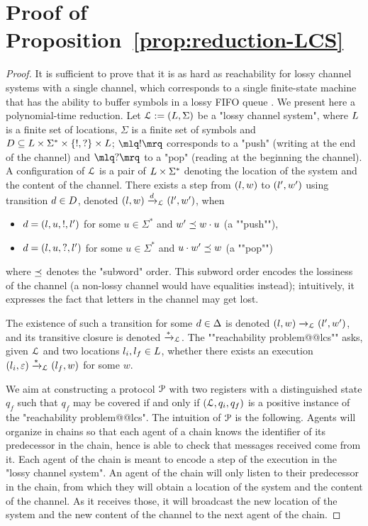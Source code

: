\section{Proof of Proposition~\ref{prop:reduction-LCS}}
\label{app:reduction-lcs}

\propReductionLCS*

\begin{proof}
	It is sufficient to prove that it is as hard as reachability for lossy channel systems with a single channel, which corresponds to a single finite-state machine that has the ability to buffer symbols in a lossy FIFO queue \cite{Schnoebelen2002verifying}. We present here a polynomial-time reduction.
	Let $\mathcal{L} := (L,\Sigma)$ be a "lossy channel system", where $L$ is a finite set of locations, $\Sigma$ is a finite set of symbols and $D \subseteq L \times \Sigma^* \times \{!, ?\} \times L$; $\quotemarks{!}$ corresponds to a "push" (writing at the end of the channel) and $\quotemarks{?}$ to a "pop" (reading at the beginning the channel). A configuration of $\mathcal{L}$ is a pair of $L \times \Sigma^*$ denoting the location of the system and the content of the channel. There exists a step from $(l,w)$ to $(l',w')$ using transition $d \in D$, denoted $(l,w) \xrightarrow{d}_{\mathcal{L}} (l',w')$, when
	\begin{itemize}
		\item $d = (l,u,!,l')$ for some $u \in \Sigma^*$ and $w' \preceq w \cdot u$ (a ""push""),
		\item $d = (l,u,?,l')$ for some $u \in \Sigma^*$ and $u \cdot w' \preceq w$ (a ""pop"")
	\end{itemize}
	where $\preceq$ denotes the "subword" order.
	This subword order encodes the lossiness of the channel (a non-lossy channel would have equalities instead); intuitively, it expresses the fact that letters in the channel may get lost. 
	
	The existence of such a transition for some $d \in \Delta$ is denoted $(l,w) \xrightarrow{}_{\mathcal{L}} (l',w')$, and its transitive closure is denoted $\xrightarrow{*}_{\mathcal{L}}$. The ""reachability problem@@lcs"" asks, given $\mathcal{L}$ and two locations $l_i, l_f \in L$, whether there exists an execution $(l_i,\varepsilon) \xrightarrow{*}_{\mathcal{L}} (l_f, w)$ for some $w$. 
	
	We aim at constructing a protocol $\mathcal{P}$ with two registers with a distinguished state $q_f$ such that $q_f$ may be covered if and only if $(\mathcal{L}, q_i, q_f)$ is a positive instance of the "reachability problem@@lcs". 
	The intuition of $\mathcal{P}$ is the following. Agents will organize in chains so that each agent of a chain knows the identifier of its predecessor in the chain, hence is able to check that messages received come from it. Each agent of the chain is meant to encode a step of the execution in the "lossy channel system". 
	An agent of the chain will only listen to their predecessor in the chain, from which they will obtain a location of the system and the content of the channel. As it receives those, it will broadcast the new location of the system and the new content of the channel to the next agent of the chain. 
	

\end{proof}
